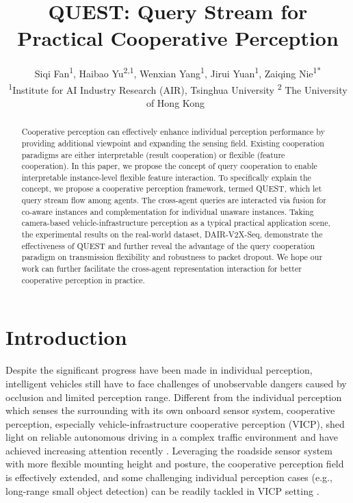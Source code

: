 \documentclass[letterpaper, 10 pt, conference]{ieeeconf}  %
\title{\LARGE \bf QUEST: Query Stream for Practical Cooperative Perception}
\author{Siqi Fan\textsuperscript{1}, Haibao Yu\textsuperscript{2,1}, Wenxian Yang\textsuperscript{1}, Jirui Yuan\textsuperscript{1}, Zaiqing Nie\textsuperscript{1*}\\
\textsuperscript{1}Institute for AI Industry Research (AIR), Tsinghua University  \textsuperscript{2} The University of Hong Kong\
}
\begin{document}
\maketitle

\renewcommand{\thefootnote}{\fnsymbol{footnote}}

\thispagestyle{empty}
\pagestyle{empty}


\begin{abstract}
  Cooperative perception can effectively enhance individual perception performance by providing additional viewpoint and expanding the sensing field. Existing cooperation paradigms are either interpretable (result cooperation) or flexible (feature cooperation). In this paper, we propose the concept of query cooperation to enable interpretable instance-level flexible feature interaction. To specifically explain the concept, we propose a cooperative perception framework, termed QUEST, which let query stream flow among agents. The cross-agent queries are interacted via fusion for co-aware instances and complementation for individual unaware instances. Taking camera-based vehicle-infrastructure perception as a typical practical application scene, the experimental results on the real-world dataset, DAIR-V2X-Seq, demonstrate the effectiveness of QUEST and further reveal the advantage of the query cooperation paradigm on transmission flexibility and robustness to packet dropout. We hope our work can further facilitate the cross-agent representation interaction for better cooperative perception in practice.
\end{abstract}


\section{Introduction}

Despite the significant progress have been made in individual perception, intelligent vehicles still have to face challenges of unobservable dangers caused by occlusion and limited perception range. Different from the individual perception which senses the surrounding with its own onboard sensor system, cooperative perception, especially vehicle-infrastructure cooperative perception (VICP), shed light on reliable autonomous driving in a complex traffic environment and have achieved increasing attention recently \cite{9732063, han2023collaborative}. Leveraging the roadside sensor system with more flexible mounting height and posture, the cooperative perception field is effectively extended, and some challenging individual perception cases (e.g., long-range small object detection) can be readily tackled in VICP setting \cite{yu2022dair, cbr}.
\end{document}
